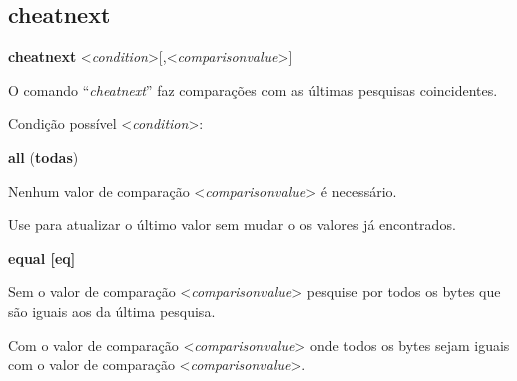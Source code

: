 \documentclass[letterpaper,10pt,brazil]{sphinxmanual}
\begin{document}
\subsection{cheatnext}
\label{debugger/cheats:debugger-command-cheatnext}\label{debugger/cheats:cheatnext}
\begin{DUlineblock}{0em}
\item[]
\begin{DUlineblock}{\DUlineblockindent}
\item[] \textbf{cheatnext} \textless{}\emph{condition}\textgreater{}{[},\textless{}\emph{comparisonvalue}\textgreater{}{]}
\item[] 
\end{DUlineblock}
\item[] O comando ``\emph{cheatnext}'' faz comparações com as últimas pesquisas coincidentes.
\item[] 
\item[] Condição possível \textless{}\emph{condition}\textgreater{}:
\item[] 
\item[]
\begin{DUlineblock}{\DUlineblockindent}
\item[] \textbf{all} (\textbf{todas})
\item[] 
\end{DUlineblock}
\item[] Nenhum valor de comparação \textless{}\emph{comparisonvalue}\textgreater{} é necessário.
\item[] 
\item[] Use para atualizar o último valor sem mudar o os valores já encontrados.
\item[] 
\item[]
\begin{DUlineblock}{\DUlineblockindent}
\item[] \textbf{equal {[}eq{]}}
\item[] 
\end{DUlineblock}
\item[] Sem o valor de comparação \textless{}\emph{comparisonvalue}\textgreater{} pesquise por todos os bytes que são iguais aos da última pesquisa.
\item[] Com o valor de comparação \textless{}\emph{comparisonvalue}\textgreater{} onde todos os bytes sejam iguais com o valor de comparação \textless{}\emph{comparisonvalue}\textgreater{}.
\item[] 
\item[]
\begin{DUlineblock}{\DUlineblockindent}

\end{DUlineblock}
\end{DUlineblock}
\end{document}
